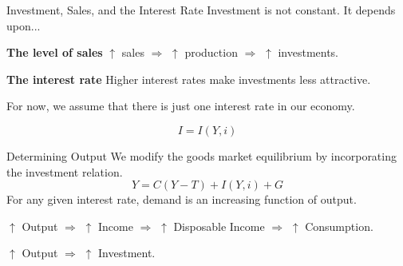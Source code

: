 \documentclass[shownotes,11pt, aspectratio=169]{beamer}
\newenvironment{wideitemize}{\itemize\addtolength{\itemsep}{10pt}}{\enditemize}
\begin{document}
\begin{frame}{Investment, Sales, and the Interest Rate}
Investment is not constant. It depends upon... \pause
\begin{wideitemize}
\item \textbf{The level of sales} \pause $\uparrow$ sales $\Rightarrow$ $\uparrow$ production $\Rightarrow$ $\uparrow$ investments. \pause
\item \textbf{The interest rate} Higher interest rates make investments less attractive. 
\item For now, we assume that there is just one interest rate in our economy.
\item \[ I = I(Y, i) \]
\end{wideitemize}
\end{frame}

\begin{frame}{Determining Output}
We modify the goods market equilibrium by incorporating the investment relation.
\[ Y = C(Y - T) + I(Y,i) + G \]
For any given interest rate, demand is an increasing function of output.
\begin{wideitemize}
\item $\uparrow$ Output $\Rightarrow$ $\uparrow$ Income $\Rightarrow$ $\uparrow$ Disposable Income $\Rightarrow$ $\uparrow$ Consumption.
\item $\uparrow$ Output $\Rightarrow$ $\uparrow$ Investment.
\end{wideitemize}
\end{frame}
\end{document}
